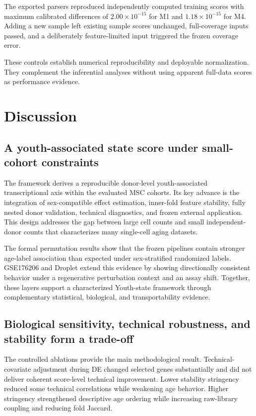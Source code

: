 \documentclass[10pt,twocolumn]{article}
\begin{document}
The exported parsers reproduced independently computed training scores with maximum calibrated differences of \(2.00\times10^{-15}\) for M1 and \(1.18\times10^{-15}\) for M4. Adding a new sample left existing sample scores unchanged, full-coverage inputs passed, and a deliberately feature-limited input triggered the frozen coverage error.

These controls establish numerical reproducibility and deployable normalization. They complement the inferential analyses without using apparent full-data scores as performance evidence.

\FloatBarrier
\section{Discussion}\label{discussion}

\subsection{A youth-associated state score under small-cohort constraints}\label{a-youth-associated-state-score-under-small-cohort-constraints}

The framework derives a reproducible donor-level youth-associated transcriptional axis within the evaluated MSC cohorts. Its key advance is the integration of sex-compatible effect estimation, inner-fold feature stability, fully nested donor validation, technical diagnostics, and frozen external application. This design addresses the gap between large cell counts and small independent-donor counts that characterizes many single-cell aging datasets.

The formal permutation results show that the frozen pipelines contain stronger age-label association than expected under sex-stratified randomized labels. GSE176206 and Droplet extend this evidence by showing directionally consistent behavior under a regenerative perturbation context and an assay shift. Together, these layers support a characterized Youth-state framework through complementary statistical, biological, and transportability evidence.

\subsection{Biological sensitivity, technical robustness, and stability form a trade-off}\label{biological-sensitivity-technical-robustness-and-stability-form-a-trade-off}

The controlled ablations provide the main methodological result. Technical-covariate adjustment during DE changed selected genes substantially and did not deliver coherent score-level technical improvement. Lower stability stringency reduced some technical correlations while weakening age behavior. Higher stringency strengthened descriptive age ordering while increasing raw-library coupling and reducing fold Jaccard.
\end{document}
